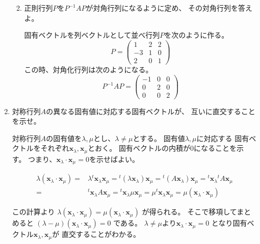 \documentclass[10pt,a4paper]{ltjsarticle}
\begin{document}
\begin{enumerate}
\begin{enumerate}
              \hrulefill
        \item 正則行列$P$を$P^{-1}AP$が対角行列になるように定め、
              その対角行列を答えよ。

              \dotfill

              固有ベクトルを列ベクトルとして並べ行列$P$を次のように作る。
              \begin{equation}
               P=\begin{pmatrix} 1&2&2\\ -3&1&0\\ 2&0&1\end{pmatrix}
              \end{equation}
              この時、対角化行列は次のようになる。
              \begin{equation}
               P^{-1}AP=\begin{pmatrix} -1&0&0\\ 0&2&0\\ 0&0&2\end{pmatrix}
              \end{equation}
       \end{enumerate}
       \hrulefill
 \item 対称行列$A$の異なる固有値に対応する固有ベクトルが、
       互いに直交することを示せ。

       \dotfill

       対称行列$A$の固有値を$\lambda, \mu$とし、$\lambda\ne\mu$とする。
       固有値$\lambda, \mu$に対応する
       固有ベクトルをそれぞれ$\bm{x}_{\lambda}, \bm{x}_{\mu}$とおく。
       固有ベクトルの内積が0になることを示す。
       つまり、$\bm{x}_{\lambda}\cdot\bm{x}_{\mu}=0$を示せばよい。

       \begin{align}
        \lambda (\bm{x}_{\lambda}\cdot\bm{x}_{\mu})
        =& \lambda {}^{t}\bm{x}_{\lambda}\bm{x}_{\mu}
        = {}^{t}(\lambda\bm{x}_{\lambda})\bm{x}_{\mu}
        = {}^{t}(A\bm{x}_{\lambda})\bm{x}_{\mu}
        = {}^{t}\bm{x}_{\lambda}{}^{t}A\bm{x}_{\mu}\\
        =& {}^{t}\bm{x}_{\lambda}A\bm{x}_{\mu}
        = {}^{t}\bm{x}_{\lambda}\mu\bm{x}_{\mu}
        = \mu{}^{t}\bm{x}_{\lambda}\bm{x}_{\mu}
        = \mu (\bm{x}_{\lambda}\cdot\bm{x}_{\mu})
       \end{align}

       この計算より
       $\lambda (\bm{x}_{\lambda}\cdot\bm{x}_{\mu})
       = \mu (\bm{x}_{\lambda}\cdot\bm{x}_{\mu})$
       が得られる。
       そこで移項してまとめると
       $(\lambda-\mu) (\bm{x}_{\lambda}\cdot\bm{x}_{\mu})=0$
       である。
       $\lambda\ne\mu$より$\bm{x}_{\lambda}\cdot\bm{x}_{\mu}=0$
       となり固有ベクトル$\bm{x}_{\lambda}, \bm{x}_{\mu}$が
       直交することがわかる。
\end{enumerate}
\end{document}
